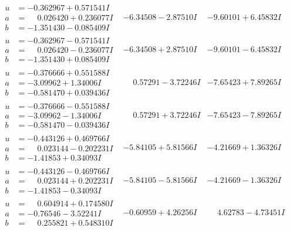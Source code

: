 \documentclass[1p]{elsarticle_modified}
\theoremstyle{definition}
\begin{document}
$$\begin{array}{c|c|c}
\begin{aligned}
u &= -0.362967 + 0.571541 I \\
a &= \phantom{-}0.026420 + 0.236077 I \\
b &= -1.351430 - 0.085409 I\end{aligned}
 & -6.34508 - 2.87510 I & -9.60101 + 6.45832 I \\ \hline\begin{aligned}
u &= -0.362967 - 0.571541 I \\
a &= \phantom{-}0.026420 - 0.236077 I \\
b &= -1.351430 + 0.085409 I\end{aligned}
 & -6.34508 + 2.87510 I & -9.60101 - 6.45832 I \\ \hline\begin{aligned}
u &= -0.376666 + 0.551588 I \\
a &= -3.09962 + 1.34006 I \\
b &= -0.581470 + 0.039436 I\end{aligned}
 & \phantom{-}0.57291 - 3.72246 I & -7.65423 + 7.89265 I \\ \hline\begin{aligned}
u &= -0.376666 - 0.551588 I \\
a &= -3.09962 - 1.34006 I \\
b &= -0.581470 - 0.039436 I\end{aligned}
 & \phantom{-}0.57291 + 3.72246 I & -7.65423 - 7.89265 I \\ \hline\begin{aligned}
u &= -0.443126 + 0.469766 I \\
a &= \phantom{-}0.023144 - 0.202231 I \\
b &= -1.41853 + 0.34093 I\end{aligned}
 & -5.84105 + 5.81566 I & -4.21669 + 1.36326 I \\ \hline\begin{aligned}
u &= -0.443126 - 0.469766 I \\
a &= \phantom{-}0.023144 + 0.202231 I \\
b &= -1.41853 - 0.34093 I\end{aligned}
 & -5.84105 - 5.81566 I & -4.21669 - 1.36326 I \\ \hline\begin{aligned}
u &= \phantom{-}0.604914 + 0.174580 I \\
a &= -0.76546 - 3.52241 I \\
b &= \phantom{-}0.255821 + 0.548310 I\end{aligned}
 & -0.60959 + 4.26256 I & \phantom{-}4.62783 - 4.73451 I \\ \hline\begin{aligned}

\end{aligned}
\end{array}$$
\end{document}
